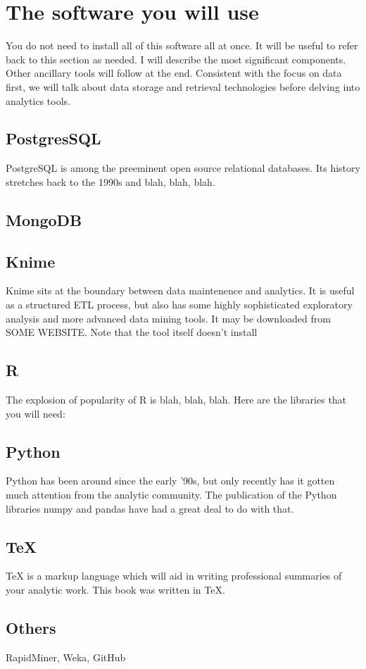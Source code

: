 \chapter{The software you will use}
You do not need to install all of this software all at once. It will be useful to refer back to this section as needed. I will describe the most significant components. Other ancillary tools will follow at the end. Consistent with the focus on data first, we will talk about data storage and retrieval technologies before delving into analytics tools.
\section{PostgresSQL}
PostgreSQL is among the preeminent open source relational databases. Its history stretches back to the 1990s and blah, blah, blah.
\section{MongoDB}
\section{Knime}
Knime sits at the boundary between data maintenence and analytics. It is useful as a structured ETL process, but also has some highly sophisticated exploratory analysis and more advanced data mining tools. It may be downloaded from SOME WEBSITE. Note that the tool itself doesn't install 
\section{R}
The explosion of popularity of R is blah, blah, blah. Here are the libraries that you will need:
\section{Python}
Python has been around since the early '90s, but only recently has it gotten much attention from the analytic community. The publication of the Python libraries numpy and pandas have had a great deal to do with that.
\section{TeX}
TeX is a markup language which will aid in writing professional summaries of your analytic work. This book was written in TeX.
\section{Others}
RapidMiner, Weka, GitHub
